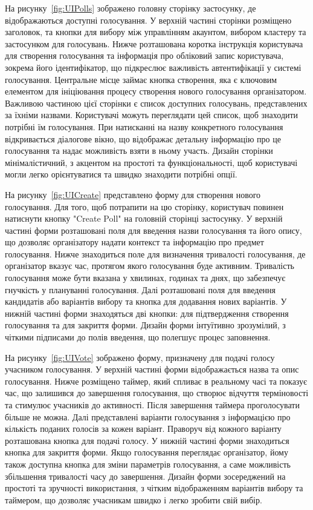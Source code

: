 \documentclass[14pt]{extreport}
\begin{document}
  На рисунку~\ref{fig:UIPolls} зображено головну сторінку застосунку, де відображаються доступні голосування. У верхній частині сторінки розміщено заголовок, та кнопки для вибору між управлінням акаунтом, вибором кластеру та застосунком для голосувань. Нижче розташована коротка інструкція користувача для створення голосування та інформація про обліковий запис користувача, зокрема його ідентифікатор, що підкреслює важливість автентифікації у системі голосування. Центральне місце займає кнопка створення, яка є ключовим елементом для ініціювання процесу створення нового голосування організатором. Важливою частиною цієї сторінки є список доступних голосувань, представлених за їхніми назвами. Користувачі можуть переглядати цей список, щоб знаходити потрібні їм голосування. При натисканні на назву конкретного голосування відкривається діалогове вікно, що відображає детальну інформацію про це голосування та надає можливість взяти в ньому участь. Дизайн сторінки мінімалістичний, з акцентом на простоті та функціональності, щоб користувачі могли легко орієнтуватися та швидко знаходити потрібні опції.

  На рисунку~\ref{fig:UICreate} представлено форму для створення нового голосування. Для того, щоб потрапити на цю сторінку, користувач повинен натиснути кнопку "Create Poll" на головній сторінці застосунку. У верхній частині форми розташовані поля для введення назви голосування та його опису, що дозволяє організатору надати контекст та інформацію про предмет голосування. Нижче знаходиться поле для визначення тривалості голосування, де організатор вказує час, протягом якого голосування буде активним. Тривалість голосування може бути вказана у хвилинах, годинах та днях, що забезпечує гнучкість у плануванні голосування. Далі розташовані поля для введення кандидатів або варіантів вибору та кнопка для додавання нових варіантів. У нижній частині форми знаходяться дві кнопки: для підтвердження створення голосування та для закриття форми. Дизайн форми інтуїтивно зрозумілий, з чіткими підписами до полів введення, що полегшує процес заповнення.

  На рисунку~\ref{fig:UIVote} зображено форму, призначену для подачі голосу учасником голосування. У верхній частині форми відображається назва та опис голосування. Нижче розміщено таймер, який спливає в реальному часі та показує час, що залишився до завершення голосування, що створює відчуття терміновості та стимулює учасників до активності. Після завершення таймера проголосувати більше не можна. Далі представлені варіанти голосування з інформацією про кількість поданих голосів за кожен варіант. Праворуч від кожного варіанту розташована кнопка для подачі голосу. У нижній частині форми знаходиться кнопка для закриття форми. Якщо голосування переглядає організатор, йому також доступна кнопка для зміни параметрів голосування, а саме можливість збільшення тривалості часу до завершення. Дизайн форми зосереджений на простоті та зручності використання, з чітким відображенням варіантів вибору та таймером, що дозволяє учасникам швидко і легко зробити свій вибір.
\end{document}

